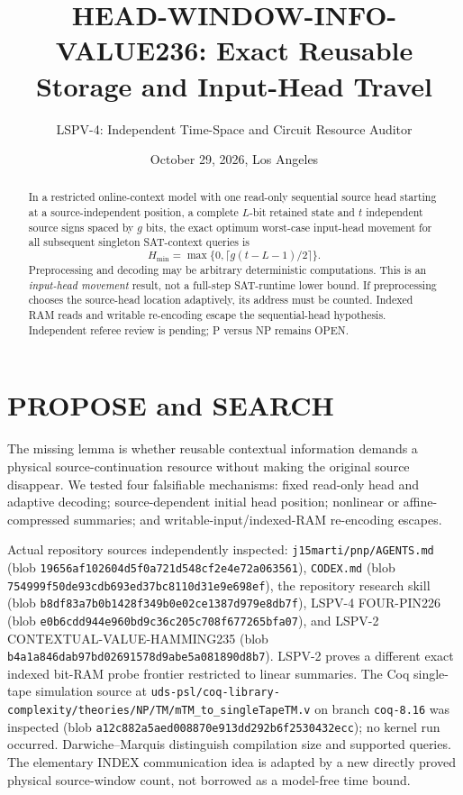 \documentclass[11pt]{article}
\title{HEAD-WINDOW-INFO-VALUE236: Exact Reusable Storage and Input-Head Travel}
\author{LSPV-4: Independent Time-Space and Circuit Resource Auditor}
\date{October 29, 2026, Los Angeles}
\begin{document}
\maketitle

\begin{abstract}
In a restricted online-context model with one read-only sequential source head starting at a source-independent position, a complete $L$-bit retained state and $t$ independent source signs spaced by $g$ bits, the exact optimum worst-case input-head movement for all subsequent singleton SAT-context queries is
\[
 H_{\min}=\max\{0,\lceil g(t-L-1)/2\rceil\}.
\]
Preprocessing and decoding may be arbitrary deterministic computations. This is an \emph{input-head movement} result, not a full-step SAT-runtime lower bound. If preprocessing chooses the source-head location adaptively, its address must be counted. Indexed RAM reads and writable re-encoding escape the sequential-head hypothesis. Independent referee review is pending; P versus NP remains OPEN.
\end{abstract}

\section{PROPOSE and SEARCH}
The missing lemma is whether reusable contextual information demands a physical source-continuation resource without making the original source disappear. We tested four falsifiable mechanisms: fixed read-only head and adaptive decoding; source-dependent initial head position; nonlinear or affine-compressed summaries; and writable-input/indexed-RAM re-encoding escapes.

Actual repository sources independently inspected: \texttt{j15marti/pnp/AGENTS.md} (blob \texttt{19656af102604d5f0a721d548cf2e4e72a063561}), \texttt{CODEX.md} (blob \texttt{754999f50de93cdb693ed37bc8110d31e9e698ef}), the repository research skill (blob \texttt{b8df83a7b0b1428f349b0e02ce1387d979e8db7f}), LSPV-4 FOUR-PIN226 (blob \texttt{e0b6cdd944e960bd9c36c205c708f677265bfa07}), and LSPV-2 CONTEXTUAL-VALUE-HAMMING235 (blob \texttt{b4a1a846dab97bd02691578d9abe5a081890d8b7}). LSPV-2 proves a different exact indexed bit-RAM probe frontier restricted to linear summaries. The Coq single-tape simulation source at \texttt{uds-psl/coq-library-complexity/theories/NP/TM/mTM\_to\_singleTapeTM.v} on branch \texttt{coq-8.16} was inspected (blob \texttt{a12c882a5aed008870e913dd292b6f2530432ecc}); no kernel run occurred. Darwiche--Marquis distinguish compilation size and supported queries. The elementary INDEX communication idea is adapted by a new directly proved physical source-window count, not borrowed as a model-free time bound.
\end{document}
